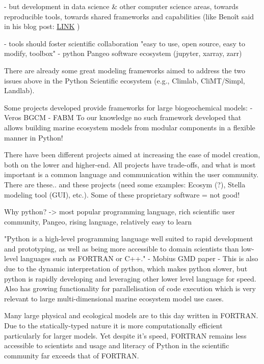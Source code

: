 \documentclass[journal abbreviation, manuscript]{copernicus}
\begin{document}
- but development in data science \& other computer science areas, towards reproducible tools, towards shared frameworks and capabilities (like Benoît said in his blog post: \href{https://medium.com/pangeo/pangeo-data-and-models-280b251ff0cd}{LINK} )

- tools should foster scientific collaboration
"easy to use, open source, easy to modify, toolbox"
- python Pangeo software ecosystem (jupyter, xarray, zarr)


There are already some great modeling frameworks aimed to address the two issues above in the Python Scientific ecosystem (e.g., Climlab, CliMT/Simpl, Landlab).

Some projects developed provide frameworks for large biogeochemical models:
- Veros BGCM
- FABM
To our knowledge no such framework developed that allows building marine ecosystem models from modular components in a flexible manner in Python!

There have been different projects aimed at increasing the ease of model creation, both on the lower and higher-end. All projects have trade-offs, and what is most important is a common language and communication within the user community.
There are these.. and these projects (need some examples: Ecosym (?), Stella modeling tool (GUI), etc.).
Some of these proprietary software = not good!


Why python? -> most popular programming language, rich scientific user community, Pangeo, rising language, relatively easy to learn

"Python is a high-level programming language well suited to rapid development and prototyping, as well as being more accessible to domain scientists than low-level languages such as FORTRAN or C++." - Mobius GMD paper
- This is also due to the dynamic interpretation of python, which makes python slower, but python is rapidly developing and leveraging other lower level language for speed. Also has growing functionality for parallelisation of code execution which is very relevant to large multi-dimensional marine ecosystem model use cases. 

Many large physical and ecological models are to this day written in FORTRAN. Due to the statically-typed nature it is more computationally efficient particularly for larger models. Yet despite it's speed, FORTRAN remains less accessible to scientists and usage and literacy of Python in the scientific community far exceeds that of FORTRAN.
\end{document}
